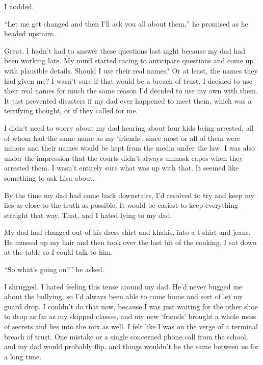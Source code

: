 I nodded.



``Let me get changed and then I'll ask you all about them,'' he promised as he headed upstairs.



Great.  I hadn't had to answer these questions last night because my dad had been working late.  My mind started racing to anticipate questions and come up with plausible details.  Should I use their real names?  Or at least, the names they had given me?  I wasn't sure if that would be a breach of trust.  I decided to use their real names for much the same reason I'd decided to use my own with them.  It just prevented disasters if my dad ever happened to meet them, which was a terrifying thought, or if they called for me.



I didn't need to worry about my dad hearing about four kids being arrested, all of whom had the same name as my `friends', since most or all of them were minors and their names would be kept from the media under the law.  I was also under the impression that the courts didn't always unmask capes when they arrested them.  I wasn't entirely sure what was up with that.  It seemed like something to ask Lisa about.



By the time my dad had come back downstairs, I'd resolved to try and keep my lies as close to the truth as possible.  It would be easiest to keep everything straight that way.  That, and I hated lying to my dad.



My dad had changed out of his dress shirt and khakis, into a t-shirt and jeans.  He mussed up my hair and then took over the last bit of the cooking.  I sat down at the table so I could talk to him.



``So what's going on?'' he asked.



I shrugged.  I hated feeling this tense around my dad.  He'd never bugged me about the bullying, so I'd always been able to come home and sort of let my guard drop.  I couldn't do that now, because I was just waiting for the other shoe to drop as far as my skipped classes, and my new `friends' brought a whole mess of secrets and lies into the mix as well.  I felt like I was on the verge of a terminal breach of trust.  One mistake or a single concerned phone call from the school, and my dad would probably flip, and things wouldn't be the same between us for a long time.




